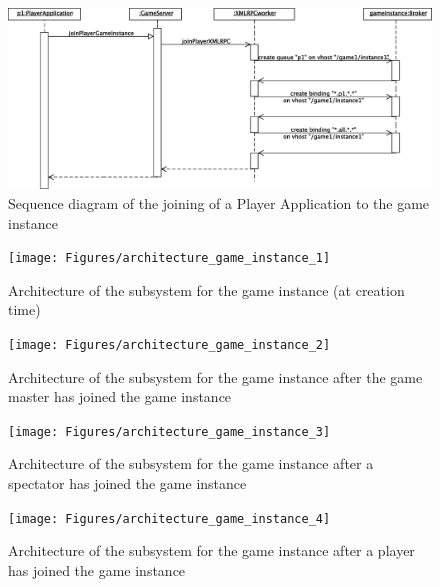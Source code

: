\begin{figure}[htbp!]
\begin{center}
\includegraphics[scale=0.4]{Figures/_integration_sequence_game_instance_3}
\caption{Sequence diagram of the joining of a \textsf{Player
    Application} to the game instance}
\label{F_integration_sequence_game_instance_3}
\end{center}
\end{figure}

\begin{figure}[htbp!]
\begin{center}
\texttt{[image: Figures/architecture\_game\_instance\_1]}
\caption{Architecture of the subsystem for the game instance
  (at creation time)}
\label{F_architecture_game_instance_1}
\end{center}
\end{figure}

\begin{figure}[htbp!]
\begin{center}
\texttt{[image: Figures/architecture\_game\_instance\_2]}
\caption{Architecture of the subsystem for the game instance after
  the game master has joined the game instance}
\label{F_architecture_game_instance_2}
\end{center}
\end{figure}

\begin{figure}[htbp!]
\begin{center}
\texttt{[image: Figures/architecture\_game\_instance\_3]}
\caption{Architecture of the subsystem for the game instance after a
  spectator has joined the game instance}
\label{F_architecture_game_instance_3}
\end{center}
\end{figure}

\begin{figure}[htbp!]
\begin{center}
\texttt{[image: Figures/architecture\_game\_instance\_4]}
\caption{Architecture of the subsystem for the game instance after a
  player has joined the game instance}
\label{F_architecture_game_instance_4}
\end{center}
\end{figure}

